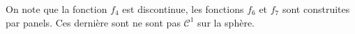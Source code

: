 \begin{remarque}
On note que la fonction $f_4$ est discontinue, les fonctions $f_6$ et $f_7$ sont construites par panels. Ces dernière sont ne sont pas $\mathcal{C}^1$ sur la sphère.
\end{remarque}




























